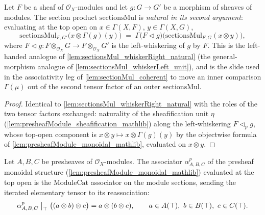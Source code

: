 \begin{lemma}

  \label{lem:sectionsMul_whiskerLeft_natural}
  Let \(F\) be a sheaf of \(\mathcal{O}_X\)-modules and let \(g : G \to G'\) be a
  morphism of sheaves of modules. The section product \(\mathrm{sectionsMul}\) is
  \emph{natural in its second argument}: evaluating at the top open on
  \(x \in \Gamma(X,F)\), \(y \in \Gamma(X,G)\),
  \[
    \mathrm{sectionsMul}_{F,G'}\bigl(x \otimes \Gamma(g)(y)\bigr)
      \;=\;
    \Gamma\bigl(F \lhd g\bigr)\bigl(\mathrm{sectionsMul}_{F,G}(x \otimes y)\bigr),
  \]
  where \(F \lhd g : F \otimes_{\mathcal{O}_X} G \to F \otimes_{\mathcal{O}_X} G'\) is
  the left-whiskering of \(g\) by \(F\). This is the left-handed analogue of
  \cref{lem:sectionsMul_whiskerRight_natural} (the general-morphism analogue of
  \cref{lem:sectionsMul_whiskerLeft_unit}), and is the slide used in the associativity
  leg of \cref{lem:sectionMul_coherent} to move an inner comparison \(\Gamma(\mu)\) out
  of the second tensor factor of an outer \(\mathrm{sectionsMul}\).
\end{lemma}

\begin{proof}
  \leanok

  Identical to \cref{lem:sectionsMul_whiskerRight_natural} with the roles of the two
  tensor factors exchanged: naturality of the sheafification unit \(\eta\)
  (\cref{lem:presheafModule_sheafification_mathlib}) along the left-whiskering
  \(F \lhd_p g\), whose top-open component is
  \(x \otimes y \mapsto x \otimes \Gamma(g)(y)\) by the objectwise formula of
  \cref{lem:presheafModule_monoidal_mathlib}, evaluated on \(x \otimes y\).
\end{proof}

\begin{lemma}

  \label{lem:presheafAssociator_top_apply}
  Let \(A, B, C\) be presheaves of \(\mathcal{O}_X\)-modules. The associator
  \(\alpha^{p}_{A,B,C}\) of the presheaf monoidal structure
  (\cref{lem:presheafModule_monoidal_mathlib}) evaluated at the top open is the
  \(\mathrm{ModuleCat}\) associator on the module sections, sending the iterated
  elementary tensor to its reassociation:
  \[
    \alpha^{p}_{A,B,C}\bigm|_{\top}\bigl((a \otimes b) \otimes c\bigr)
      = a \otimes (b \otimes c),
    \qquad a \in A(\top),\ b \in B(\top),\ c \in C(\top).
  \]
\end{lemma}


